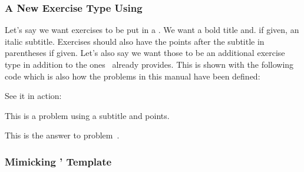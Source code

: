 \documentclass{xsim-manual}
\begin{document}
\subsubsection{A New Exercise Type Using }
Let's say we want exercises to be put in a . We want a bold
title and. if given, an italic subtitle.  Exercises should also have the
points after the subtitle in parentheses if given.  Let's also say we want
those to be an additional exercise type in addition to the ones \xsim\ already
provides.  This is shown with the following code which is also how the
problems in this manual have been defined:

\begin{sourcecode}
    {%
      \tcolorbox[
        colback = red!5!white ,
        colframe = red!75!black ,
        colbacktitle = yellow!50!red ,
        coltitle = red!25!black ,
        breakable ,
        drop shadow ,
        beforeafter skip = .5\baselineskip ,
        title =
          \textbf{\GetExerciseName~\GetExerciseProperty{counter}}%
          \GetExercisePropertyT{subtitle}{ \textit{\PropertyValue}}%
          \IfInsideSolutionF{%
            \GetExercisePropertyT{points}{ %
              (%
                \printgoal{\PropertyValue}
                \IfExerciseGoalSingularTF{points}
                  {\XSIMtranslate{point}}
                  {\XSIMtranslate{points}}%
              )%
            }%
          }%
      ]%
    }
    {\endtcolorbox}

\end{sourcecode}

See it in action:
\begin{example}
  \begin{problem}[subtitle=My subtitle,points=5]
    This is a problem using a subtitle and points.
  \end{problem}
  \begin{answer}
    This is the answer to problem~.
  \end{answer}
\end{example}

\subsubsection{Mimicking '  Template}
\label{sec:runin-template}
\end{document}
